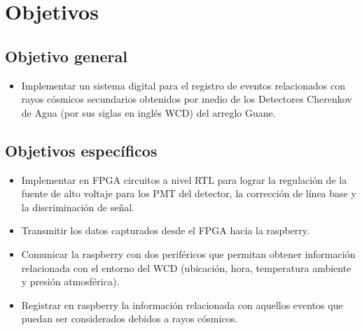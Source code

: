 \chapter{Objetivos}

\section*{Objetivo general}

\begin{itemize}
  \item[ ]Implementar un sistema digital para el registro de eventos relacionados con rayos cósmicos secundarios obtenidos por medio de los Detectores Cherenkov de Agua (por sus siglas en inglés WCD) del arreglo Guane.
\end{itemize}

\section*{Objetivos específicos}
\begin{itemize}
  \item[ ]Implementar en FPGA circuitos a nivel RTL para lograr la regulación de la fuente de alto voltaje para los PMT del detector, la corrección de línea base y la discriminación de señal.
  
  \item[ ]Transmitir los datos capturados desde el FPGA hacia la raspberry.
  
  \item[ ]Comunicar la raspberry con dos periféricos que permitan obtener información relacionada con el entorno del WCD (ubicación, hora, temperatura ambiente y presión atmosférica).
  
  \item[ ]Registrar en raspberry la información relacionada con aquellos eventos que puedan ser considerados debidos a rayos cósmicos.
\end{itemize}
